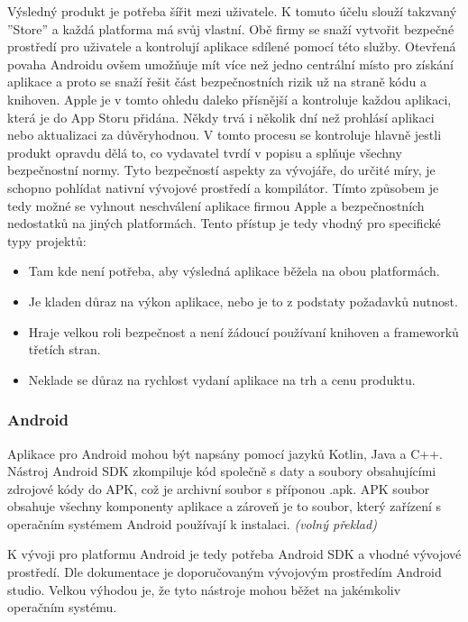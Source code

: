 \documentclass[
  biblatex,
  glossaries,
  index
]{kidiplom}
\begin{document}
Výsledný produkt je potřeba šířit mezi uživatele. K tomuto účelu slouží takzvaný ''Store'' a každá platforma má svůj vlastní. Obě firmy se snaží vytvořit bezpečné prostředí pro uživatele a kontrolují aplikace sdílené pomocí této služby. Otevřená povaha Androidu ovšem umožňuje mít více než jedno centrální místo pro získání aplikace a proto se snaží řešit část bezpečnostních rizik už na straně kódu a knihoven. Apple je v tomto ohledu daleko přísnější a kontroluje každou aplikaci, která je do App Storu přidána. Někdy trvá i několik dní než prohlásí aplikaci nebo aktualizaci za důvěryhodnou. V tomto procesu se kontroluje hlavně jestli produkt opravdu dělá to, co vydavatel tvrdí v popisu a splňuje všechny bezpečnostní normy. Tyto bezpečností aspekty za vývojáře, do určité míry, je schopno pohlídat nativní vývojové prostředí a kompilátor. Tímto způsobem je tedy možné se vyhnout neschválení aplikace firmou Apple a bezpečnostních nedostatků na jiných platformách. Tento přístup je tedy vhodný pro specifické typy projektů:
\begin{itemize}
	\item Tam kde není potřeba, aby výsledná aplikace běžela na obou platformách.
  	\item Je kladen důraz na výkon aplikace, nebo je to z podstaty požadavků nutnost.
  	\item Hraje velkou roli bezpečnost a není žádoucí používaní knihoven a frameworků třetích stran. 
  	\item Neklade se důraz na rychlost vydaní aplikace na trh a cenu produktu.
 \end{itemize}

\subsubsection{Android}
Aplikace pro Android mohou být napsány pomocí jazyků Kotlin, Java a C++. Nástroj Android SDK zkompiluje kód společně s daty a soubory obsahujícími zdrojové kódy do APK, což je archivní soubor s příponou .apk. APK soubor obsahuje všechny komponenty aplikace a zároveň je to soubor, který zařízení s operačním systémem Android používají k instalaci.
\cite{1}
\textit{(volný překlad)}

K vývoji pro platformu Android je tedy potřeba Android SDK a vhodné vývojové prostředí. Dle dokumentace je doporučovaným vývojovým prostředím Android studio. Velkou výhodou je, že tyto nástroje mohou běžet na jakémkoliv operačním systému.
\end{document}
